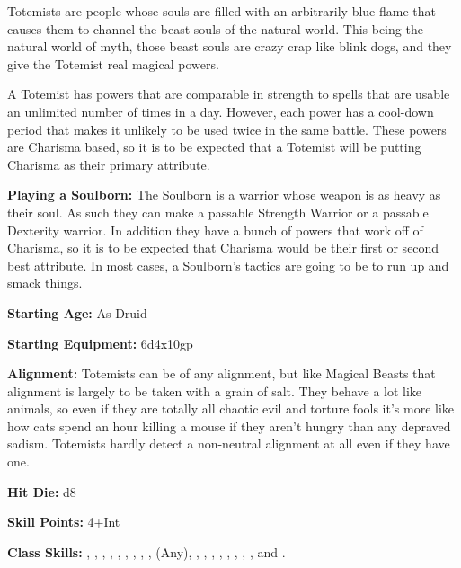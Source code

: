 
Totemists are people whose souls are filled with an arbitrarily blue flame that causes them to channel the beast souls of the natural world. This being the natural world of myth, those beast souls are crazy crap like blink dogs, and they give the Totemist real magical powers. 

A Totemist has powers that are comparable in strength to spells that are usable an unlimited number of times in a day. However, each power has a cool-down period that makes it unlikely to be used twice in the same battle. These powers are Charisma based, so it is to be expected that a Totemist will be putting Charisma as their primary attribute. 

\textbf{Playing a Soulborn:} The Soulborn is a warrior whose weapon is as heavy as their soul. As such they can make a passable Strength Warrior or a passable Dexterity warrior. In addition they have a bunch of powers that work off of Charisma, so it is to be expected that Charisma would be their first or second best attribute. In most cases, a Soulborn's tactics are going to be to run up and smack things. 

\textbf{Starting Age:} As Druid

\textbf{Starting Equipment:} 6d4x10gp 

\textbf{Alignment:} Totemists can be of any alignment, but like Magical Beasts that alignment is largely to be taken with a grain of salt. They behave a lot like animals, so even if they are totally all chaotic evil and torture fools it's more like how cats spend an hour killing a mouse if they aren't hungry than any depraved sadism. Totemists hardly detect a non-neutral alignment at all even if they have one. 

\textbf{Hit Die:} d8

\modebab{}

\poorfor{}
\poorref{}
\goodwil{}

\textbf{Skill Points:} 4+Int 

\textbf{Class Skills:} , , , , , , , , ,  (Any), , , , , , , , , and .

